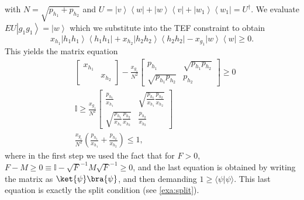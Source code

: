 \documentclass{theoretics}
\begin{document}
\begin{itemize}
        with $N=\sqrt{p_{h_{1}}+p_{h_{2}}}$ and
        $
          U=\left|v\right\rangle \left\langle w\right|+\left|w\right\rangle \left\langle v\right|+\left|w_{1}\right\rangle \left\langle w_{1}\right|=U^{\dagger}.
        $
        We evaluate $EU\left|g_{1}g_{1}\right\rangle =\left|w\right\rangle $
        which we substitute into the TEF constraint to obtain
        \begin{displaymath}
          x_{h_{1}}\left|h_{1}h_{1}\right\rangle \left\langle h_{1}h_{1}\right|+x_{h_{2}}\left|h_{2}h_{2}\right\rangle \left\langle h_{2}h_{2}\right|-x_{g_{1}}\left|w\right\rangle \left\langle w\right|\ge0.
        \end{displaymath}
        This yields the matrix equation
        \begin{align*}
           & \left[\begin{array}{cc}
                       x_{h_{1}}    \\
                        & x_{h_{2}}
                     \end{array}\right]-\frac{x_{g_{1}}}{N^{2}}\left[\begin{array}{cc}
                                                                       p_{h_{1}}                 & \sqrt{p_{h_{1}}p_{h_{2}}} \\
                                                                       \sqrt{p_{h_{1}}p_{h_{2}}} & p_{h_{2}}
                                                                     \end{array}\right]  \ge0                                            \\
           & \mathbb{I}\ge \frac{x_{g_1}}{N^{2}}\left[\begin{array}{cc}
                                                          \frac{p_{h_1}}{x_{h_{1}} }                                  & \sqrt{\frac{p_{h_1}}{x_{h_{1}} }\frac{p_{h_2}}{x_{h_{2}} }} \\
                                                          \sqrt{\frac{p_{h_1}}{x_{h_{1}} }\frac{p_{h_2}}{x_{h_{2}} }} & \frac{p_{h_2}}{x_{h_{2}} }
                                                        \end{array}\right] \\
           & \frac{x_{g_{1}}}{N^{2}}\left(\frac{p_{h_{1}}}{x_{h_{1}}}+\frac{p_{h_{2}}}{x_{h_{2}}}\right)  \le 1,
        \end{align*}where in the first step we used the fact that for $F>0$, $F-M\ge 0 \equiv \mathbb{I}-\sqrt{F}^{-1}M\sqrt{F}^{-1}\ge 0$, and the last equation is obtained by writing the matrix as $\ket{\psi}\bra{\psi}$, and then demanding $1\ge\langle\psi|\psi\rangle$.
        This last equation is
        exactly the
        split condition (see \cref{exa:split}).
\end{itemize}
\end{document}
